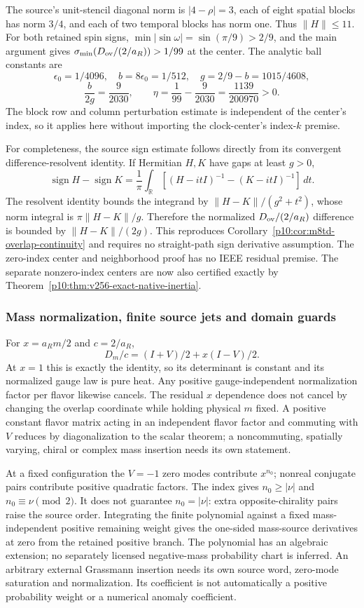 \documentclass[12pt,a4paper]{article}
\begin{document}
The source's unit-stencil diagonal norm is $|4-\rho|=3$, each of eight
spatial blocks has norm $3/4$, and each of two temporal blocks has norm
one. Thus $\|H\|\le11$. For both retained spin signs,
$\min|\sin\omega|=\sin(\pi/9)>2/9$, and the main argument gives
$\sigma_{\min}(D_{\rm ov}/(2/a_R))>1/99$ at the center.
The analytic ball constants are
\[
 \epsilon_0=1/4096,\quad b=8\epsilon_0=1/512,\quad
 g=2/9-b=1015/4608,
\]
\[
 \frac{b}{2g}=\frac9{2030},\qquad
 \eta=\frac1{99}-\frac9{2030}=\frac{1139}{200970}>0.
\]
The block row and column perturbation estimate is independent of the
center's index, so it applies here without importing the clock-center's
index-$k$ premise.

For completeness, the source sign estimate follows directly from its
convergent difference-resolvent identity. If Hermitian $H,K$ have gaps
at least $g>0$,
\[
 \operatorname{sign}H-\operatorname{sign}K
 =\frac1\pi\int_{\mathbb R}
      [(H-itI)^{-1}-(K-itI)^{-1}]\,dt.
\]
The resolvent identity bounds the integrand by
$\|H-K\|/(g^2+t^2)$, whose norm integral is $\pi\|H-K\|/g$.
Therefore the normalized $D_{\rm ov}/(2/a_R)$ difference is bounded by
$\|H-K\|/(2g)$. This reproduces
Corollary~\ref{p10:cor:m8td-overlap-continuity} and requires no
straight-path sign derivative assumption. The zero-index center and
neighborhood proof has no IEEE residual premise. The separate
nonzero-index centers are now also certified exactly by
Theorem~\ref{p10:thm:v256-exact-native-inertia}.


\subsubsection{Mass normalization, finite source jets and domain guards}
For $x=a_Rm/2$ and $c=2/a_R$,
\[
 D_m/c=(I+V)/2+x(I-V)/2.
\]
At $x=1$ this is exactly the identity, so its determinant is constant and
its normalized gauge law is pure heat. Any positive gauge-independent
normalization factor per flavor likewise cancels. The residual $x$
dependence does not cancel by changing the overlap coordinate while holding
physical $m$ fixed. A positive constant flavor matrix acting in an
independent flavor factor and commuting with $V$ reduces by diagonalization
to the scalar theorem; a noncommuting, spatially varying, chiral or complex
mass insertion needs its own statement.

At a fixed configuration the $V=-1$ zero modes contribute $x^{n_0}$;
nonreal conjugate pairs contribute positive quadratic factors. The index
gives $n_0\ge|\nu|$ and $n_0\equiv\nu\pmod2$. It does not guarantee
$n_0=|\nu|$: extra opposite-chirality pairs raise the source order.
Integrating the finite polynomial against a fixed mass-independent positive
remaining weight gives the one-sided mass-source derivatives at zero from
the retained positive branch. The polynomial has an algebraic extension;
no separately licensed negative-mass probability chart is inferred.
An arbitrary external Grassmann insertion needs its own source word,
zero-mode saturation and normalization. Its coefficient is not automatically
a positive probability weight or a numerical anomaly coefficient.
\end{document}
